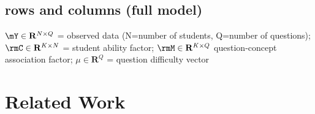 \subsection{rows and columns (full model)}
$\mY\in\mathbf{R}^{N\times Q}$ = observed data (N=number of students, Q=number of questions); $\rmC\in\mathbf{R}^{K\times N}$ = student ability factor; $\rmM\in\mathbf{R}^{K\times Q}$ question-concept association factor; $\mu\in\mathbf{R}^Q$ = question difficulty vector
\section{Related Work}